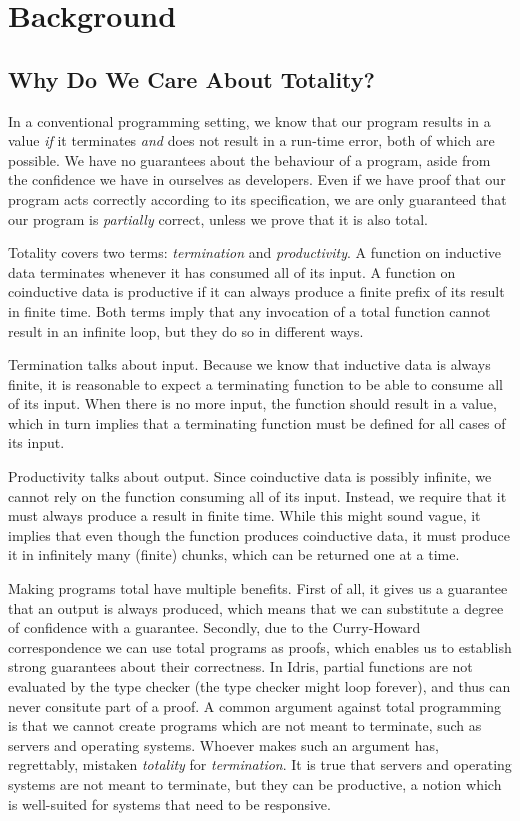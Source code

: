 \section{Background}
\label{sec:background}

\subsection{Why Do We Care About Totality?}
In a conventional programming setting, we know that our program results in a value \emph{if} it terminates \emph{and} does not result in a run-time error, both of which are possible. We have no guarantees about the behaviour of a program, aside from the confidence we have in ourselves as developers. Even if we have proof that our program acts correctly according to its specification, we are only guaranteed that our program is \emph{partially} correct, unless we prove that it is also total.

Totality covers two terms: \emph{termination} and \emph{productivity}. A function on inductive data terminates whenever it has consumed all of its input. A function on coinductive data is productive if it can always produce a finite prefix of its result in finite time. Both terms imply that any invocation of a total function cannot result in an infinite loop, but they do so in different ways. 

Termination talks about input. Because we know that inductive data is always finite, it is reasonable to expect a terminating function to be able to consume all of its input. When there is no more input, the function should result in a value, which in turn implies that a terminating function must be defined for all cases of its input. 

Productivity talks about output. Since coinductive data is possibly infinite, we cannot rely on the function consuming all of its input. Instead, we require that it must always produce a result in finite time. While this might sound vague, it implies that even though the function produces coinductive data, it must produce it in infinitely many (finite) chunks, which can be returned one at a time.

Making programs total have multiple benefits. First of all, it gives us a guarantee that an output is always produced, which means that we can substitute a degree of confidence with a guarantee. Secondly, due to the Curry-Howard correspondence we can use total programs as proofs, which enables us to establish strong guarantees about their correctness. In Idris, partial functions are not evaluated by the type checker (the type checker might loop forever), and thus can never consitute part of a proof. A common argument against total programming is that we cannot create programs which are not meant to terminate, such as servers and operating systems. Whoever makes such an argument has, regrettably, mistaken \emph{totality} for \emph{termination}. It is true that servers and operating systems are not meant to terminate, but they can be productive, a notion which is well-suited for systems that need to be responsive.

